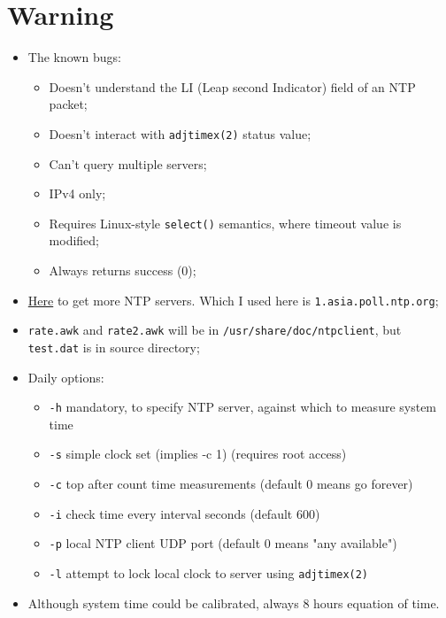 \documentclass[a4paper]{report}
\begin{document}
\section{Warning}
\begin{itemize}
    \item The known bugs:
    \begin{itemize}
        \item Doesn't understand the LI (Leap second Indicator) field of an NTP packet;
        \item Doesn't interact with {\tt adjtimex(2)} status value;
        \item Can't query multiple servers;
        \item IPv4 only;
        \item Requires Linux-style {\tt select()} semantics, 
              where timeout value is modified;
        \item Always returns success (0);
    \end{itemize}
    \item \href{http://www.pool.ntp.org/zone/cn}{Here} to get more NTP servers. Which I used here is 
          {\tt 1.asia.poll.ntp.org};
    \item {\tt rate.awk} and {\tt rate2.awk} will be in {\tt /usr/share/doc/ntpclient}, but 
          {\tt test.dat} is in source directory;
    \item Daily options:
    \begin{itemize}
        \item {\tt -h} mandatory, to specify NTP server, 
                       against which to measure system time
        \item {\tt -s} simple clock set (implies -c 1) (requires root access)
        \item {\tt -c} top after count time measurements (default 0 means go forever)
        \item {\tt -i} check time every interval seconds (default 600)
        \item {\tt -p} local NTP client UDP port (default 0 means "any available")
        \item {\tt -l} attempt to lock local clock to server using {\tt adjtimex(2)}
    \end{itemize}
    \item Although system time could be calibrated, always 8 hours equation of time.
\end{itemize}
\end{document}
